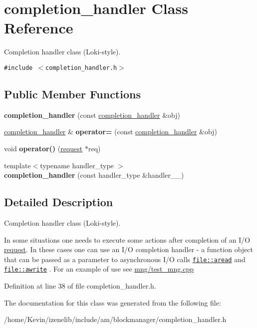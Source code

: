 \hypertarget{classcompletion__handler}{
\section{completion\_\-handler Class Reference}
\label{classcompletion__handler}
}
Completion handler class (Loki-style).  


{\tt \#include $<$completion\_\-handler.h$>$}

\subsection*{Public Member Functions}
\begin{CompactItemize}
\item 
\hypertarget{classcompletion__handler_63b1275782e8d0a5b320e5938b09766c}{
\textbf{completion\_\-handler} (const \hyperlink{classcompletion__handler}{completion\_\-handler} \&obj)}
\label{classcompletion__handler_63b1275782e8d0a5b320e5938b09766c}

\item 
\hypertarget{classcompletion__handler_6b1cfd19f13814d73ea385ff0376ebe4}{
\hyperlink{classcompletion__handler}{completion\_\-handler} \& \textbf{operator=} (const \hyperlink{classcompletion__handler}{completion\_\-handler} \&obj)}
\label{classcompletion__handler_6b1cfd19f13814d73ea385ff0376ebe4}

\item 
\hypertarget{classcompletion__handler_cdcb747d587cfc02306d0f6447c4abed}{
void \textbf{operator()} (\hyperlink{classrequest}{request} $\ast$req)}
\label{classcompletion__handler_cdcb747d587cfc02306d0f6447c4abed}

\item 
\hypertarget{classcompletion__handler_198d05cf82bec9e1ba16828def28d3c5}{
{\footnotesize template$<$typename handler\_\-type $>$ }\\\textbf{completion\_\-handler} (const handler\_\-type \&handler\_\-\_\-)}
\label{classcompletion__handler_198d05cf82bec9e1ba16828def28d3c5}

\end{CompactItemize}


\subsection{Detailed Description}
Completion handler class (Loki-style). 

In some situations one needs to execute some actions after completion of an I/O \hyperlink{classrequest}{request}. In these cases one can use an I/O completion handler - a function object that can be passed as a parameter to asynchronous I/O calls {\tt \href{file::aread}{\tt file::aread}} and {\tt \href{file::awrite}{\tt file::awrite}} . For an example of use see \hyperlink{}{mng/test\_\-mng.cpp } 

Definition at line 38 of file completion\_\-handler.h.

The documentation for this class was generated from the following file:\begin{CompactItemize}
\item 
/home/Kevin/izenelib/include/am/blockmanager/completion\_\-handler.h\end{CompactItemize}
